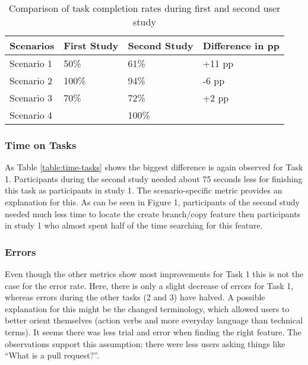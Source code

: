 \begin{table}[h!]
\centering
\begin{tabular}{|l|l|l|l|}
\hline
\rowcolor[HTML]{EFEFEF}
{\bf Scenarios} & {\bf First Study} & {\bf Second Study} & {\bf Difference in pp} \\ \hline
Scenario 1 & 50\% & 61\% & +11 pp \\ \hline
Scenario 2 & 100\% & 94\% & -6 pp \\ \hline
Scenario 3 & 70\% & 72\% & +2 pp \\ \hline
Scenario 4 &  & 100\% &  \\ \hline
\end{tabular}
\caption{Comparison of task completion rates during first and second user study}
\label{table:task-compl}
\end{table}

\subsubsection{Time on Tasks}
As Table \ref{table:time-tasks} shows the biggest difference is again observed for Task 1. Participants during the second study needed about 75 seconds less for finishing this task as participants in study 1. The scenario-specific metric provides an explanation for this. As can be seen in Figure 1, participants of the second study needed much less time to locate the create branch/copy feature then participants in study 1 who almost spent half of the time searching for this feature.

\begin{table}[h!]
\centering
{}
\caption{Time on tasks (in seconds)}
\label{table:time-tasks}
\end{table}

\subsubsection{Errors}
Even though the other metrics show most improvements for Task 1 this is not the case for the error rate. Here, there is only a slight decrease of errors for Task 1, whereas errors during the other tasks (2 and 3) have halved. A possible explanation for this might be the changed terminology, which allowed users to better orient themselves (action verbs and more everyday language than technical terms). It seems there was less trial and error when finding the right feature. The observations support this assumption; there were less users asking things like “What is a pull request?”.

